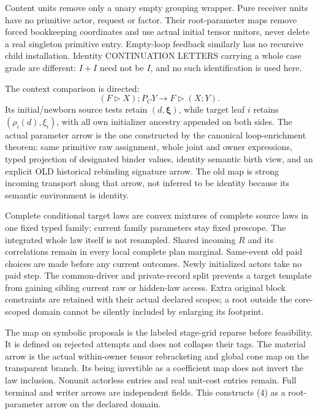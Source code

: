 \documentclass[11pt]{article}
\begin{document}
Content units remove only a unary empty grouping wrapper. Pure receiver units have no primitive actor, request or factor. Their root-parameter maps remove forced bookkeeping coordinates and use actual initial tensor unitors, never delete a real singleton primitive entry. Empty-loop feedback similarly has no recursive child installation. Identity CONTINUATION LETTERS carrying a whole case grade are different: $I+I$ need not be $I$, and no such identification is used here.

The context comparison is directed:
\[
 (F\triangleright X);P_CY\longrightarrow F\triangleright(X;Y).
 \tag{4}
\]
Its initial/newborn source tests retain $(d,\boldsymbol\xi)$, while target leaf $i$ retains $(\rho_i(d),\xi_i)$, with all own initializer ancestry appended on both sides. The actual parameter arrow is the one constructed by the canonical loop-enrichment theorem: same primitive raw assignment, whole joint and owner expressions, typed projection of designated binder values, identity semantic birth view, and an explicit OLD historical rebinding signature arrow. The old map is strong incoming transport along that arrow, not inferred to be identity because its semantic environment is identity.

Complete conditional target laws are convex mixtures of complete source laws in one fixed typed family; current family parameters stay fixed prescope. The integrated whole law itself is not resampled. Shared incoming $R$ and its correlations remain in every local complete plan marginal. Same-event old paid choices are made before any current outcomes. Newly initialized actors take no paid step. The common-driver and private-record split prevents a target template from gaining sibling current raw or hidden-law access. Extra original block constraints are retained with their actual declared scopes; a root outside the core-scoped domain cannot be silently included by enlarging its footprint.

The map on symbolic proposals is the labeled stage-grid reparse before feasibility. It is defined on rejected attempts and does not collapse their tags. The material arrow is the actual within-owner tensor rebracketing and global cone map on the transparent branch. Its being invertible as a coefficient map does not invert the law inclusion. Nonunit actorless entries and real unit-cost entries remain. Full terminal and writer arrows are independent fields. This constructs (4) as a root-parameter arrow on the declared domain.
\end{document}

